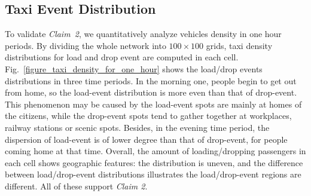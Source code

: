 \subsection{Taxi Event Distribution}
\label{section_taxi_denstiy_distribution}


To validate \emph{Claim~2}, we quantitatively analyze vehicles density in one hour periods. By dividing the whole network into $100 \times 100$ grids, taxi density distributions for load and drop event are computed in each cell. Fig.~\ref{figure_taxi_density_for_one_hour} shows the load/drop events distributions in three time periods. In the morning one, people begin to get out from home, so the load-event distribution is more even than that of drop-event. This phenomenon may be caused by the load-event spots are mainly at homes of the citizens, while the drop-event spots tend to gather together at workplaces, railway stations or scenic spots. Besides, in the evening time period, the dispersion of load-event is of lower degree than that of drop-event, for people coming home at that time. Overall, the amount of loading/dropping passengers in each cell shows geographic features: the distribution is uneven, and the difference between load/drop-event distributions illustrates the load/drop-event regions are different. All of these support \emph{Claim 2}.



